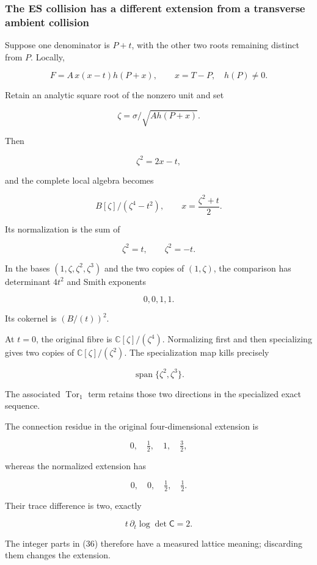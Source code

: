 \subsubsection{The ES collision has a different extension from a
transverse ambient
collision}\label{the-es-collision-has-a-different-extension-from-a-transverse-ambient-collision}

Suppose one denominator is \(P+t\), with the other two roots remaining
distinct from \(P\). Locally,

\[
F=A\,x(x-t)h(P+x),\qquad x=T-P,\quad h(P)\ne0.
\]

Retain an analytic square root of the nonzero unit and set

\[
\zeta=\sigma/\sqrt{Ah(P+x)}.
\]

Then

\[
\zeta^2=2x-t,
\]

and the complete local algebra becomes

\[
\boxed{
B[\zeta]/(\zeta^4-t^2),
\qquad
x=\frac{\zeta^2+t}{2}.
}
\tag{35}
\]

Its normalization is the sum of

\[
\zeta^2=t,\qquad \zeta^2=-t.
\]

In the bases \((1,\zeta,\zeta^2,\zeta^3)\) and the two copies of
\((1,\zeta)\), the comparison has determinant \(4t^2\) and Smith
exponents

\[
0,0,1,1.
\]

Its cokernel is \((B/(t))^2\).

At \(t=0\), the original fibre is \(\mathbb C[\zeta]/(\zeta^4)\).
Normalizing first and then specializing gives two copies of
\(\mathbb C[\zeta]/(\zeta^2)\). The specialization map kills precisely

\[
\operatorname{span}\{\zeta^2,\zeta^3\}.
\]

The associated \(\operatorname{Tor}_1\) term retains those two
directions in the specialized exact sequence.

The connection residue in the original four-dimensional extension is

\[
\boxed{0,\quad\tfrac12,\quad1,\quad\tfrac32,}
\tag{36}
\]

whereas the normalized extension has

\[
0,\quad0,\quad\tfrac12,\quad\tfrac12.
\]

Their trace difference is two, exactly

\[
t\,\partial_t\log\det\mathsf C=2.
\]

The integer parts in (36) therefore have a measured lattice meaning;
discarding them changes the extension.

